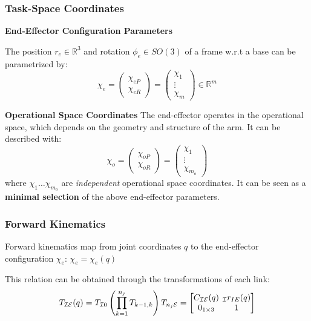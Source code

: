 \documentclass[fontsize=6pt,DIV=calc,a4paper,ngerman]{scrartcl}
\begin{document}
\begin{multicols*}{4}
	\subsubsection{Task-Space Coordinates}
	\textbf{End-Effector Configuration Parameters}

	The position $r_e\in \mathbb{R}^3$ and rotation $\phi_e \in SO(3)$ of a frame w.r.t a base can be parametrized by:
	$$\chi_e = \begin{pmatrix}\chi_{eP} \\ \chi_{eR}\end{pmatrix} = \left(\begin{smallmatrix}\chi_{1} \\\vdots \\\chi_{m}\end{smallmatrix}\right)\in \mathbb{R}^m$$

	\textbf{Operational Space Coordinates}
	The end-effector operates in the operational space, which depends on the geometry and structure of the arm. It can be described with:
	$$\chi_o = \begin{pmatrix}\chi_{oP} \\ \chi_{oR}\end{pmatrix}=\left(\begin{smallmatrix}\chi_{1} \\\vdots \\\chi_{m_o}\end{smallmatrix}\right)$$
	where $\chi_1 \dots \chi_{m_o}$  are \textit{independent} operational space coordinates. It can be seen as a \textbf{minimal selection} of the above end-effector parameters.

	\subsubsection{Forward Kinematics}
	Forward kinematics map from joint coordinates $q$ to the end-effector configuration $\chi_e$: \quad $\chi_e = \chi_e(q)$

	This relation can be obtained through the transformations of each link:\\
	$$ T_\mathcal{IE}(q)=T_{\mathcal{I}0} \left(\prod_{k=1}^{n_j}T_{k-1,k}\right)T_{n_j\mathcal{E}}=
		\setlength\arraycolsep{2pt}
		\begin{bmatrix}
			C_\mathcal{IE}(q) & {}_\mathcal{I}r_{IE}(q) \\
			0_{1\times 3}     & 1
		\end{bmatrix}$$


\end{multicols*}
\end{document}
